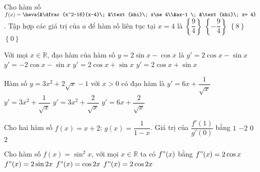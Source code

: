 \begin{ex}%
Cho hàm số $f(x)=\heva{&\dfrac{x^2-16}{x-4}\; &\text{khi}\; x\ne 4\\&ax-1 \; &\text{khi}\; x= 4}$. Tập hợp các giá trị của $a$ để hàm số liên tục tại $x=4$ là
\choice
{\True $\left\{\dfrac{9}{4}\right\}$}
{$\left\{-\dfrac{9}{4}\right\}$}
{$\left\{8\right\}$}
{$\left\{0\right\}$}
\end{ex}

\begin{ex}%
Với mọi $x\in\mathbb{R}$, đạo hàm của hàm số $y=2\sin x-\cos x$ là
\choice
{$y'=2\cos x-\sin x$}
{$y'=-2\cos x-\sin x$}
{$y'=2\cos x+\sin x$}
{\True $y'=2\cos x+\sin x$}
\end{ex}

\begin{ex}%
Hàm số $y=3x^2+2\sqrt{x}-1$ với $x>0$ có đạo hàm là
\choice
{\True $y'=6x+\dfrac{1}{\sqrt{x}}$}
{$y'=3x^2+\dfrac{1}{\sqrt{x}}$}
{$y'=3x^2+\dfrac{2}{\sqrt{x}}$}
{$y'=6x+\dfrac{2}{\sqrt{x}}$}
\end{ex}

\begin{ex}%
Cho hai hàm số $f(x)=x+2$; $g(x)=\dfrac{1}{1-x}$. Giá trị của $\dfrac{f'(1)}{g'(0)}$ bằng
\choice
{\True $1$}
{$-2$}
{$0$}
{$2$}
\end{ex}

\begin{ex}%
Cho hàm số $f(x)=\sin^2x$, với mọi $x\in \mathbb{R}$ ta có $f"(x)$ bằng
\choice
{$f"(x)=2\cos x$}
{$f"(x)=2\sin 2x$}
{$f"(x)=\cos 2x$}
{\True $f"(x)=2\cos 2x$}
\end{ex}

